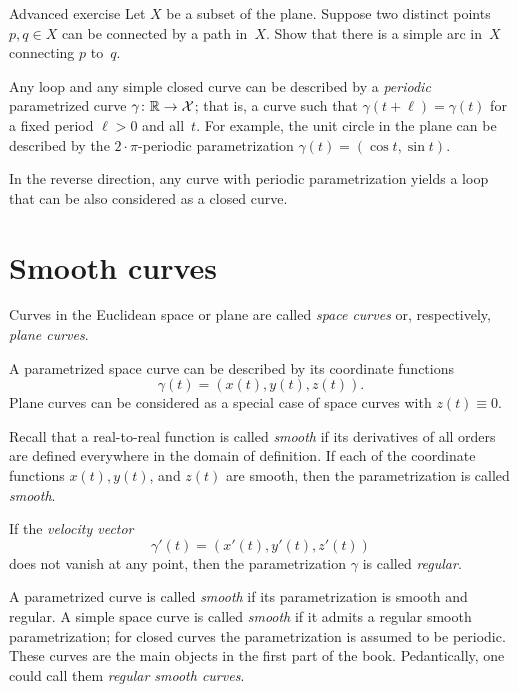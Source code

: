 \begin{thm}{Advanced exercise}\label{aex:simple-curve}
Let $X$ be a subset of the plane.
Suppose two distinct points $p,q\in X$ can be connected by a path in~$X$.
Show that there is a simple arc in~$X$ connecting $p$ to~$q$.
\end{thm}

Any loop and any simple closed curve can be described by a {}\emph{periodic} parametrized curve $\gamma\colon \mathbb{R}\to \mathcal{X}$;
that is, a curve such that $\gamma(t+\ell)=\gamma(t)$ for a fixed period $\ell>0$ and all~$t$.
For example, the unit circle in the plane can be described by the $2{\cdot}\pi$-periodic parametrization $\gamma(t)=(\cos t,\sin t)$.

In the reverse direction, any curve with periodic parametrization yields a loop that can be also considered as a closed curve. 

\section{Smooth curves}\label{sec:Smooth curves}

Curves in the Euclidean space or plane are called \emph{space curves} or, respectively, \emph{plane curves}.

A parametrized space curve can be described by its coordinate functions 
\[\gamma(t)=(x(t),y(t),z(t)).\]
Plane curves can be considered as a special case of space curves with $z(t)\equiv 0$.

Recall that a real-to-real function is called \emph{smooth} if its derivatives of all orders are defined everywhere in the domain of definition.  
If each of the coordinate functions $x(t), y(t)$, and $z(t)$ are smooth, then the parametrization is called 
\emph{smooth}.

If the \emph{velocity vector} 
\[\gamma'(t)=(x'(t),y'(t),z'(t))\] 
does not vanish at any point, then the parametrization $\gamma$ is called \emph{regular}.

A parametrized curve is called {}\emph{smooth} if its parametrization is smooth and regular.
A simple space curve is called \emph{smooth} if it admits a regular smooth parametrization;
for closed curves the parametrization is assumed to be periodic.
These curves are the main objects in the first part of the book.
Pedantically, one could call them {}\emph{regular smooth curves}. 

